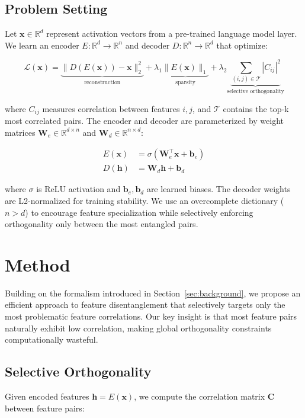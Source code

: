 \documentclass{article} %
\begin{document}
\subsection{Problem Setting}
Let $\mathbf{x} \in \mathbb{R}^d$ represent activation vectors from a pre-trained language model layer. We learn an encoder $E: \mathbb{R}^d \rightarrow \mathbb{R}^n$ and decoder $D: \mathbb{R}^n \rightarrow \mathbb{R}^d$ that optimize:

\begin{equation}
    \mathcal{L}(\mathbf{x}) = \underbrace{\|D(E(\mathbf{x})) - \mathbf{x}\|_2^2}_{\text{reconstruction}} + \lambda_1 \underbrace{\|E(\mathbf{x})\|_1}_{\text{sparsity}} + \lambda_2 \underbrace{\sum_{(i,j) \in \mathcal{T}} |C_{ij}|^2}_{\text{selective orthogonality}}
\end{equation}

where $C_{ij}$ measures correlation between features $i,j$, and $\mathcal{T}$ contains the top-k most correlated pairs. The encoder and decoder are parameterized by weight matrices $\mathbf{W}_e \in \mathbb{R}^{d \times n}$ and $\mathbf{W}_d \in \mathbb{R}^{n \times d}$:

\begin{align}
    E(\mathbf{x}) &= \sigma(\mathbf{W}_e^\top \mathbf{x} + \mathbf{b}_e) \\
    D(\mathbf{h}) &= \mathbf{W}_d \mathbf{h} + \mathbf{b}_d
\end{align}

where $\sigma$ is ReLU activation and $\mathbf{b}_e, \mathbf{b}_d$ are learned biases. The decoder weights are L2-normalized for training stability. We use an overcomplete dictionary ($n > d$) to encourage feature specialization while selectively enforcing orthogonality only between the most entangled pairs.

\section{Method}
\label{sec:method}

Building on the formalism introduced in Section~\ref{sec:background}, we propose an efficient approach to feature disentanglement that selectively targets only the most problematic feature correlations. Our key insight is that most feature pairs naturally exhibit low correlation, making global orthogonality constraints computationally wasteful.

\subsection{Selective Orthogonality}
Given encoded features $\mathbf{h} = E(\mathbf{x})$, we compute the correlation matrix $\mathbf{C}$ between feature pairs:
\end{document}
